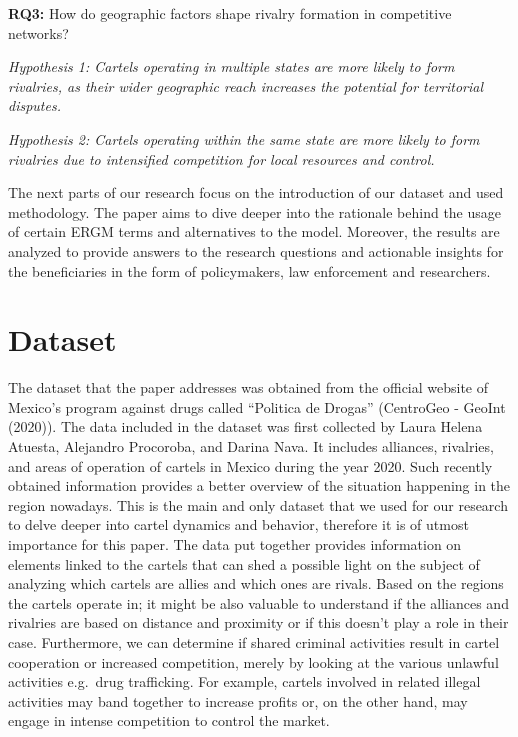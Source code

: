 \documentclass[
]{article}
\begin{document}
\textbf{RQ3:} How do geographic factors shape rivalry formation in
competitive networks?

\emph{Hypothesis 1: Cartels operating in multiple states are more likely
to form rivalries, as their wider geographic reach increases the
potential for territorial disputes.}

\emph{Hypothesis 2: Cartels operating within the same state are more
likely to form rivalries due to intensified competition for local
resources and control.}

The next parts of our research focus on the introduction of our dataset
and used methodology. The paper aims to dive deeper into the rationale
behind the usage of certain ERGM terms and alternatives to the model.
Moreover, the results are analyzed to provide answers to the research
questions and actionable insights for the beneficiaries in the form of
policymakers, law enforcement and researchers.

\section{Dataset}\label{dataset}

The dataset that the paper addresses was obtained from the official
website of Mexico's program against drugs called ``Politica de Drogas''
(CentroGeo - GeoInt (2020)). The data included in the dataset was first
collected by Laura Helena Atuesta, Alejandro Procoroba, and Darina Nava.
It includes alliances, rivalries, and areas of operation of cartels in
Mexico during the year 2020. Such recently obtained information provides
a better overview of the situation happening in the region nowadays.
This is the main and only dataset that we used for our research to delve
deeper into cartel dynamics and behavior, therefore it is of utmost
importance for this paper. The data put together provides information on
elements linked to the cartels that can shed a possible light on the
subject of analyzing which cartels are allies and which ones are rivals.
Based on the regions the cartels operate in; it might be also valuable
to understand if the alliances and rivalries are based on distance and
proximity or if this doesn't play a role in their case. Furthermore, we
can determine if shared criminal activities result in cartel cooperation
or increased competition, merely by looking at the various unlawful
activities e.g.~drug trafficking. For example, cartels involved in
related illegal activities may band together to increase profits or, on
the other hand, may engage in intense competition to control the market.
\end{document}
